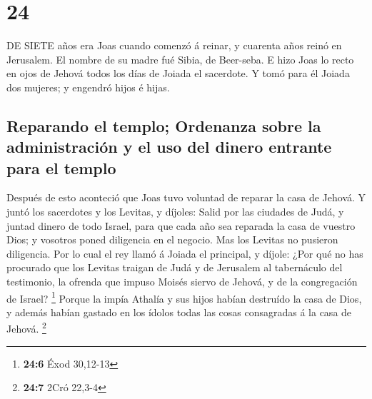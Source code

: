 \hypertarget{section-23}{%
\section{24}\label{section-23}}

 DE SIETE años era Joas cuando comenzó á reinar, y cuarenta
años reinó en Jerusalem. El nombre de su madre fué Sibia, de Beer-seba.
 E hizo Joas lo recto en ojos de Jehová todos los días de
Joiada el sacerdote.  Y tomó para él Joiada dos mujeres; y
engendró hijos é hijas.

\hypertarget{reparando-el-templo-ordenanza-sobre-la-administraciuxf3n-y-el-uso-del-dinero-entrante-para-el-templo}{%
\subsection{Reparando el templo; Ordenanza sobre la administración y el
uso del dinero entrante para el
templo}\label{reparando-el-templo-ordenanza-sobre-la-administraciuxf3n-y-el-uso-del-dinero-entrante-para-el-templo}}

 Después de esto aconteció que Joas tuvo voluntad de reparar
la casa de Jehová.  Y juntó los sacerdotes y los Levitas, y
díjoles: Salid por las ciudades de Judá, y juntad dinero de todo Israel,
para que cada año sea reparada la casa de vuestro Dios; y vosotros poned
diligencia en el negocio. Mas los Levitas no pusieron diligencia.
 Por lo cual el rey llamó á Joiada el principal, y díjole:
¿Por qué no has procurado que los Levitas traigan de Judá y de Jerusalem
al tabernáculo del testimonio, la ofrenda que impuso Moisés siervo de
Jehová, y de la congregación de Israel? \footnote{\textbf{24:6} Éxod
  30,12-13}  Porque la impía Athalía y sus hijos habían
destruído la casa de Dios, y además habían gastado en los ídolos todas
las cosas consagradas á la casa de Jehová. \footnote{\textbf{24:7} 2Cró
  22,3-4}

